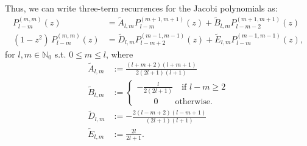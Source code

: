 \documentclass[11pt, oneside]{article}   	%
\newcommand{\No}{\mathbb{N}_0}
\newcommand{\Atilde}{\tilde{A}_{l,m}}
\newcommand{\Btilde}{\tilde{B}_{l,m}}
\newcommand{\Dtilde}{\tilde{D}_{l,m}}
\newcommand{\Etilde}{\tilde{E}_{l,m}}
\begin{document}
Thus, we can write three-term recurrences for the Jacobi polynomials as:
\begin{align}
P^{(m,m)}_{l-m}(z) &= \Atilde P^{(m+1,m+1)}_{l-m}(z) + \Btilde P^{(m+1,m+1)}_{l-m-2}(z) \\
(1-z^2) \, P^{(m,m)}_{l-m}(z) &= \Dtilde P^{(m-1,m-1)}_{l-m+2}(z) + \Etilde P^{(m-1,m-1)}_{l-m}(z),
\end{align}
for \(l, m \in \No\) s.t. \(0 \le m \le l\), where
\begin{align}
\Atilde &:= \frac{(l+m+2)(l+m+1)}{2(2l+1)(l+1)} \\
\Btilde &:= \begin{cases}
			- \frac{l}{2(2l+1)} \quad \text{if } l - m \ge 2 \\
			\quad \quad 0 \quad \quad \text{otherwise.}
		\end{cases} \\
\Dtilde &:= - \frac{2(l-m+2)(l-m+1)}{(2l+1)(l+1)} \\
\Etilde &:= \frac{2l}{2l+1} .
\end{align}
\end{document}

